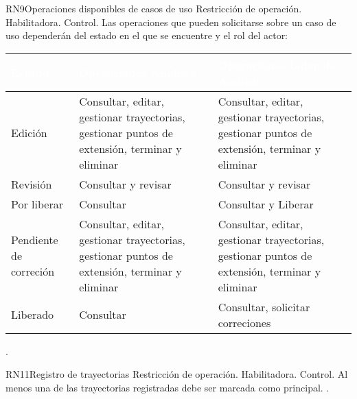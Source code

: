 \begin{BussinesRule}{RN9}{Operaciones disponibles de casos de uso} 
	\BRitem[Tipo:] Restricción de operación. 
	\BRitem[Clase:] Habilitadora. 
	\BRitem[Nivel:] Control. %
	\BRitem[Descripción:] Las operaciones que pueden solicitarse sobre un caso de uso dependerán del estado en el que se encuentre y el rol del actor:
	
	\begin{table}[H]
		\centering
		\begin{tabular}{|p{5cm}| p{5cm}| p{5cm}|}
			\hline
			\rowcolor{blue} \textcolor{white}{\textbf{Estado}} & \textcolor{white}{\textbf{Operaciones Analista}} & \textcolor{white}{\textbf{Operaciones Líder de Análisis}} \\
			\hline
			Edición & Consultar, editar, gestionar trayectorias, gestionar puntos de extensión, terminar y eliminar & Consultar, editar, gestionar trayectorias, gestionar puntos de extensión, terminar y eliminar \\
			\hline
			Revisión & Consultar y revisar & Consultar y revisar\\
			\hline
			Por liberar & Consultar & Consultar y Liberar\\
			\hline
			Pendiente de correción & Consultar, editar, gestionar trayectorias, gestionar puntos de extensión, terminar y eliminar & Consultar, editar, gestionar trayectorias, gestionar puntos de extensión, terminar y eliminar\\
			\hline
			Liberado & Consultar & Consultar, solicitar correciones\\
			\hline
		\end{tabular}
	\end{table}

	 .
	
\end{BussinesRule}

	\begin{BussinesRule}{RN11}{Registro de trayectorias} 
		\BRitem[Tipo:] Restricción de operación. 
		\BRitem[Clase:] Habilitadora. 
		\BRitem[Nivel:] Control. %
		\BRitem[Descripción:] Al menos una de las trayectorias registradas debe ser marcada como principal.
		 \UCref{}{}. 
	\end{BussinesRule}

